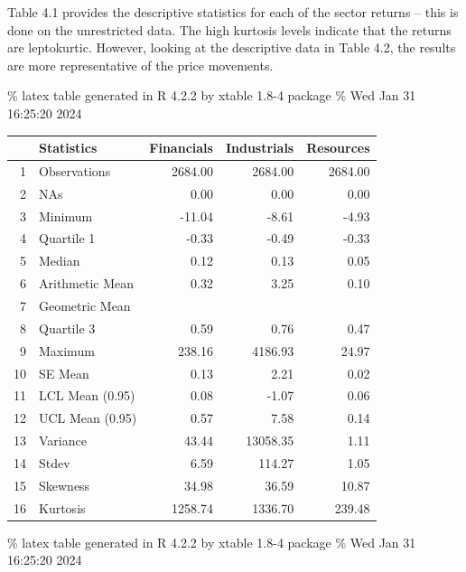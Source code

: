 \documentclass[11pt,preprint, authoryear]{elsarticle}
\let\origtable\table
\let\endorigtable\endtable
\renewenvironment{table}[1][2] {
    \expandafter\origtable\expandafter[H]
} {
    \endorigtable
}
\numberwithin{equation}{section}
\numberwithin{figure}{section}
\numberwithin{table}{section}
\begin{document}
Table 4.1 provides the descriptive statistics for each of the sector
returns -- this is done on the unrestricted data. The high kurtosis
levels indicate that the returns are leptokurtic. However, looking at
the descriptive data in Table 4.2, the results are more representative
of the price movements.

\% latex table generated in R 4.2.2 by xtable 1.8-4 package \% Wed Jan
31 16:25:20 2024

\begin{table}[ht]
\centering
\begin{tabular}{rlrrr}
  \hline
 & Statistics & Financials & Industrials & Resources \\ 
  \hline
1 & Observations & 2684.00 & 2684.00 & 2684.00 \\ 
  2 & NAs & 0.00 & 0.00 & 0.00 \\ 
  3 & Minimum & -11.04 & -8.61 & -4.93 \\ 
  4 & Quartile 1 & -0.33 & -0.49 & -0.33 \\ 
  5 & Median & 0.12 & 0.13 & 0.05 \\ 
  6 & Arithmetic Mean & 0.32 & 3.25 & 0.10 \\ 
  7 & Geometric Mean &  &  &  \\ 
  8 & Quartile 3 & 0.59 & 0.76 & 0.47 \\ 
  9 & Maximum & 238.16 & 4186.93 & 24.97 \\ 
  10 & SE Mean & 0.13 & 2.21 & 0.02 \\ 
  11 & LCL Mean (0.95) & 0.08 & -1.07 & 0.06 \\ 
  12 & UCL Mean (0.95) & 0.57 & 7.58 & 0.14 \\ 
  13 & Variance & 43.44 & 13058.35 & 1.11 \\ 
  14 & Stdev & 6.59 & 114.27 & 1.05 \\ 
  15 & Skewness & 34.98 & 36.59 & 10.87 \\ 
  16 & Kurtosis & 1258.74 & 1336.70 & 239.48 \\ 
   \hline
\end{tabular}
\caption{Descriptive Statistics Table} 
\label{tab1: DS}
\end{table}

\% latex table generated in R 4.2.2 by xtable 1.8-4 package \% Wed Jan
31 16:25:20 2024
\end{document}
